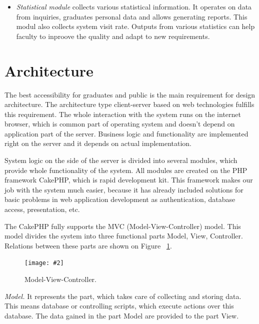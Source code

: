 \documentclass{iitsrc}[2006/14/02]
\newcommand\fig[4]{%
	\begin{figure}[h]
	\begin{center}
	\texttt{[image: \#2]}
	~\\%
	\caption{#4}
	\label{#3}
	\end{center}
	\end{figure}
}
\begin{document}
\begin{itemize}
\item {\em Statistical module}
collects various statistical information. It operates on data from inquiries, graduates personal data and allows generating reports. This modul also collects system visit rate. Outputs from various statistics can help faculty to inproove the quality and adapt to new requirements.

\end{itemize}

\section{Architecture}

The best accessibility for graduates and public is the main requirement for design architecture. The architecture type client-server based on web technologies fulfills this requirement. The whole interaction with the system runs on the internet browser, which is common part of operating system and doesn't depend on application part of the server. Business logic and functionality are implemented right on the server and it depends on actual implementation.

System logic on the side of the server is divided into several modules, which provide whole functionality of the system. All modules are created on the PHP framework CakePHP, which is rapid development kit. This framework makes our job with the system much easier, because it has already included solutions for basic problems in web application development as authentication, database access, presentation, etc.

The CakePHP fully supports the MVC (Model-View-Controller) model\cite{cakephp}. This model divides the system into three functional parts Model, View, Controller. Relations between these parts are shown on Figure ~\ref{fig:mvc}.


\fig{width=8cm}{images/mvc}{fig:mvc}{Model-View-Controller.}

{\em Model.} It represents the part, which takes care of collecting and storing data. This means database or controlling scripts, which execute actions over this database. The data gained in the part Model are provided to the part View.
\end{document}
